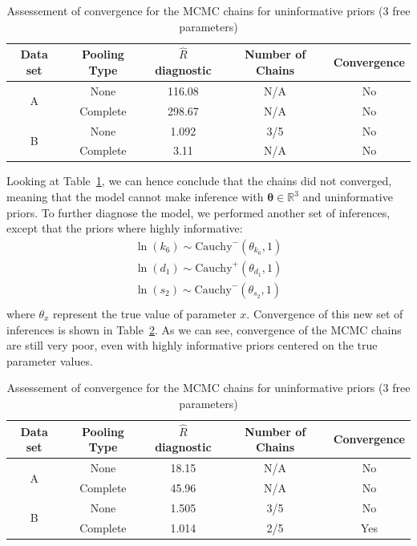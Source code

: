 \documentclass[11pt]{article}
\begin{document}
\begin{table}[!h]
    \centering
    \caption{Assessement of convergence for the MCMC chains for uninformative priors (3 free parameters)}
    \begin{tabular}{c|c||c|c|c}
        \hline
        Data set & Pooling Type & $\hat{R}$ diagnostic & Number of Chains & Convergence  \\ \hline 
        \multirow{2}{*}{A}      & None     & 116.08 & N/A & No \\
                                & Complete & 298.67 & N/A & No \\ \hline 
        \multirow{2}{*}{B}      & None     & 1.092  & 3/5 & No \\
                                & Complete & 3.11   & N/A & No \\ \hline 
    \end{tabular}
    \label{tbl:rhat_2}
\end{table}
Looking at Table~\ref{tbl:rhat_2}, we can hence conclude that the chains did not converged, meaning that the model cannot make inference with $\boldsymbol{\theta} \in \mathbb{R}^3$ and uninformative priors. To further diagnose the model, we performed another set of inferences, except that the priors where highly informative:
\begin{align*}
    \ln(k_6) \sim \text{Cauchy}^-(\theta_{k_6}, 1) \\ 
    \ln(d_1) \sim \text{Cauchy}^+(\theta_{d_1}, 1) \\ 
    \ln(s_2) \sim \text{Cauchy}^-(\theta_{s_2}, 1) \\ 
\end{align*} 
where $\theta_x$ represent the true value of parameter $x$. Convergence of this new set of inferences is shown in Table~\ref{tbl:rhat_3}. As we can see, convergence of the MCMC chains are still very poor, even with highly informative priors centered on the true parameter values.
\begin{table}[!h]
    \centering
    \caption{Assessement of convergence for the MCMC chains for uninformative priors (3 free parameters)}
    \begin{tabular}{c|c||c|c|c}
        \hline
        Data set & Pooling Type & $\hat{R}$ diagnostic & Number of Chains & Convergence  \\ \hline 
        \multirow{2}{*}{A}      & None  & 18.15 & N/A & No \\
                                & Complete & 45.96 & N/A & No \\ \hline 
        \multirow{2}{*}{B}      & None  & 1.505 & 3/5 & No \\
                                & Complete & 1.014 & 2/5 & Yes \\ \hline 
    \end{tabular}
    \label{tbl:rhat_3}
\end{table}
\end{document}
